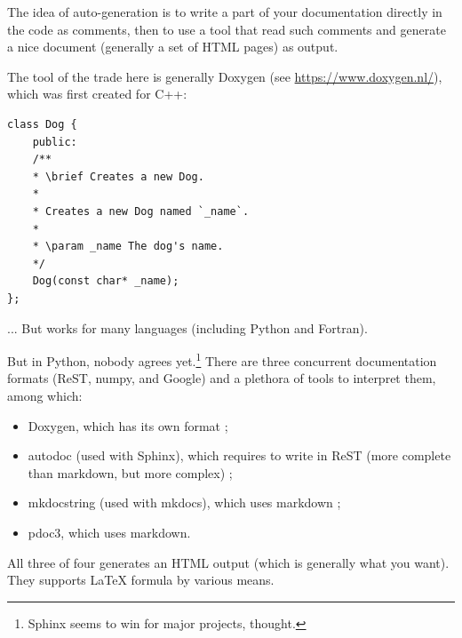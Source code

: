 \documentclass[10pt,
aspectratio=169
]{beamer}
\begin{document}
\begin{frame}[fragile]
	The idea of auto-generation is to write a part of your documentation directly in the code as comments, then to use a tool that read such comments  and generate a nice document (generally a set of HTML pages) as output. 
	
	The tool of the trade here is generally Doxygen (see \url{https://www.doxygen.nl/}), which was first created for C++:
	\begin{verbatim}
class Dog {
	public:
	/**
	* \brief Creates a new Dog.
	*
	* Creates a new Dog named `_name`.
	*
	* \param _name The dog's name.
	*/
	Dog(const char* _name);
};
	\end{verbatim}
	... But works for many languages (including Python and Fortran).
\end{frame}

\begin{frame}
	But in Python, nobody  agrees yet.\footnote{Sphinx seems to win for major projects, thought.} There are three concurrent documentation formats (ReST, numpy, and Google) and a plethora of tools to interpret them, among which:\begin{itemize}
		\item Doxygen, which has its own format ;
		\item autodoc (used with Sphinx), which requires to write in ReST (more complete than markdown, but more complex) ;
		\item mkdocstring (used with mkdocs), which uses markdown ;
		\item pdoc3, which uses markdown.
	\end{itemize}
	All three of four generates an HTML output (which is generally what you want). They supports LaTeX formula by various means.
\end{frame}
\end{document}
